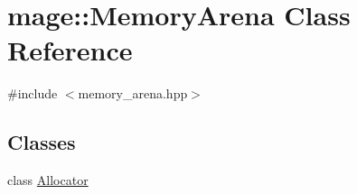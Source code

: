 \hypertarget{classmage_1_1_memory_arena}{}\section{mage\+:\+:Memory\+Arena Class Reference}
\label{classmage_1_1_memory_arena}


{\ttfamily \#include $<$memory\+\_\+arena.\+hpp$>$}

\subsection*{Classes}
\begin{DoxyCompactItemize}
\item 
class \mbox{\hyperlink{classmage_1_1_memory_arena_1_1_allocator}{Allocator}}
\end{DoxyCompactItemize}
